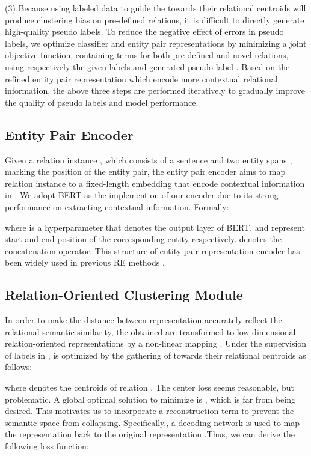 \documentclass[11pt]{article}
\begin{document}
        \noindent(3) Because using labeled data to guide the  towards their relational centroids will produce clustering bias on pre-defined relations, it is difficult to directly generate high-quality pseudo labels. To reduce the negative effect of errors in pseudo labels, we optimize classifier and entity pair representations by minimizing a joint objective function, containing terms for both pre-defined and novel relations, using respectively the given labels  and generated pseudo label . Based on the refined entity pair representation  which encode more contextual relational information, the above three steps are performed iteratively to gradually improve the quality of pseudo labels  and model performance.
        
        \subsection{Entity Pair Encoder}
        Given a relation instance , which consists of a sentence  and two entity spans ,  marking the position of the entity pair, the entity pair encoder  aims to map relation instance  to a fixed-length embedding  that encode contextual information in . We adopt BERT \citep{DBLP:journals/corr/abs-1810-04805} as the implemention of our encoder  due to its strong performance on extracting contextual information. Formally:
        
        where  is a hyperparameter that denotes the output layer of BERT.  and  represent start and end position of the corresponding entity respectively.  denotes the concatenation operator. This structure of entity pair representation encoder has been widely used in previous RE methods \citep{wang-etal-2021-enpar,hu2020selfore}.
        
        
        \subsection{Relation-Oriented Clustering Module}
In order to make the distance between representation accurately reflect the relational semantic similarity, the obtained  are transformed to low-dimensional relation-oriented representations  by a non-linear mapping . Under the supervision of labels  in ,  is optimized by the gathering of  towards their relational centroids as follows:
            
            where  denotes the centroids of relation . The center loss  seems reasonable, but problematic. A global optimal solution to minimize  is , which is far from being desired. This motivates us to incorporate a reconstruction term to prevent the semantic space from collapsing. Specifically,, a decoding network  is used to map the representation  back to the original representation .Thus, we can derive the following loss function:
            
\end{document}
